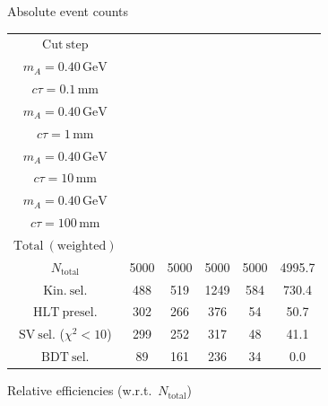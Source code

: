 \documentclass[10pt,a4paper]{article}
\renewcommand{\arraystretch}{1.4}
\begin{document}
{\footnotesize\setlength{\tabcolsep}{4pt}\renewcommand{\arraystretch}{1.05}%
\vspace{12pt}

Absolute event counts

\begin{tabular}{cccccc}
\toprule
$\mathrm{Cut\ step}$ & \shortstack{$m_{\pi}=4\,\mathrm{GeV}$\\$m_{A}=0.40\,\mathrm{GeV}$\\$c\tau=0.1\,\mathrm{mm}$} & \shortstack{$m_{\pi}=4\,\mathrm{GeV}$\\$m_{A}=0.40\,\mathrm{GeV}$\\$c\tau=1\,\mathrm{mm}$} & \shortstack{$m_{\pi}=4\,\mathrm{GeV}$\\$m_{A}=0.40\,\mathrm{GeV}$\\$c\tau=10\,\mathrm{mm}$} & \shortstack{$m_{\pi}=4\,\mathrm{GeV}$\\$m_{A}=0.40\,\mathrm{GeV}$\\$c\tau=100\,\mathrm{mm}$} & \shortstack{$\mathrm{QCD}$\\$\mathrm{Total\ (weighted)}$} \\
\midrule
$N_{\mathrm{total}}$ & 5000 & 5000 & 5000 & 5000 & 4995.7\\
$\mathrm{Kin.\ sel.}$ & 488 & 519 & 1249 & 584 & 730.4\\
$\mathrm{HLT\ presel.}$ & 302 & 266 & 376 & 54 & 50.7\\
$\mathrm{SV\ sel.}$ ($\chi^2{<}10$) & 299 & 252 & 317 & 48 & 41.1\\
$\mathrm{BDT\ sel.}$ & 89 & 161 & 236 & 34 & 0.0\\
\bottomrule
\end{tabular}

\vspace{18pt}

Relative efficiencies (w.r.t.\ $N_{\mathrm{total}}$)

}
\end{document}
